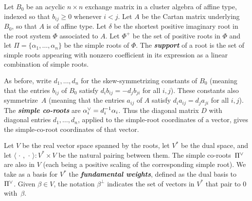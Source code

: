 \documentclass{amsart}
\theoremstyle{definition}
\theoremstyle{remark}
\numberwithin{equation}{section}
\newcommand{\newword}[1]{\textbf{\emph{#1}}}
\newcommand{\ep}{\varepsilon}
\newcommand{\set}[1]{{\lbrace #1 \rbrace}}
\newcommand{\br}[1]{{\langle #1 \rangle}}
\newcommand{\ck}{\spcheck}
\newcommand{\0}{{\mathbf{0}}}
\newcommand{\tB}{{\widetilde{B}}}
\newcommand{\symmetrizer}{{D}}
\newcommand{\RSChar}{\Phi}
\newcommand{\RS}{\RSChar}
\newcommand{\RSpos}{\RS^+}
\newcommand{\SimplesChar}{\Pi}
\newcommand{\Simples}{\SimplesChar}
\begin{document}
Let $B_0$ be an acyclic $n\times n$ exchange matrix in a cluster algebra of affine type, indexed so that $b_{ij}\ge0$ whenever $i<j$.
Let $A$ be the Cartan matrix underlying $B_0$, so that $A$ is of affine type.
Let $\delta$ be the shortest positive imaginary root in the root system $\RS$ associated to $A$.
Let $\RSpos$ be the set of positive roots in $\RS$ and let $\Simples=\set{\alpha_1,\ldots,\alpha_n}$ be the simple roots of $\RS$.
The \newword{support} of a root is the set of simple roots appearing with nonzero coefficient in its expression as a linear combination of simple roots.

As before, write $d_1,\ldots,d_n$ for the skew-symmetrizing constants of $B_0$ (meaning that the entries $b_{ij}$ of $B_0$ satisfy $d_i b_{ij}=-d_j b_{ji}$ for all $i,j$).
These constants also symmetrize~$A$ (meaning that the entries $a_{ij}$ of $A$ satisfy $d_i a_{ij}=d_j a_{ji}$ for all $i,j$).
The \newword{simple co-roots} are $\alpha_i\ck= d_i^{-1} \alpha_i$. 
Thus the diagonal matrix $\symmetrizer$ with diagonal entries $d_1,\ldots,d_n$, applied to the simple-root coordinates of a vector, gives the simple-co-root coordinates of that vector.

Let $V$ be the real vector space spanned by the roots, let $V^*$ be the dual space, and let $\br{\,\cdot\,,\,\cdot\,}:V^*\times V$ be the natural pairing between them.
The simple co-roots~$\Simples\ck$ are also in $V$ (each being a positive scaling of the corresponding simple root).
We take as a basis for $V^*$ the \newword{fundamental weights}, defined as the dual basis to~$\Simples\ck$.
Given $\beta\in V$, the notation $\beta^\perp$ indicates the set of vectors in $V^*$ that pair to $0$ with~$\beta$. 
\end{document}
